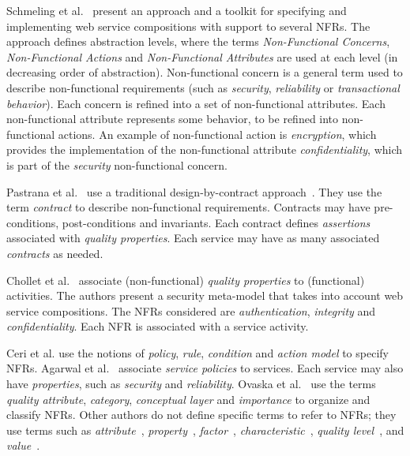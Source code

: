  
Schmeling et al.~\cite{SchmelingCM11} present an approach and a toolkit for specifying and implementing web service compositions with support to several NFRs. 
The approach defines abstraction levels, where the terms \textit{Non-Functional Concerns}, \textit{Non-Functional Actions} and \textit{Non-Functional Attributes} are used at each level (in decreasing order of abstraction).
Non-functional concern is a general term used to describe non-functional requirements (such as  \textit{security}, \textit{reliability} or \textit{transactional behavior}). 
Each concern is refined into a set of non-functional attributes.  
Each non-functional attribute represents some behavior, to be refined into non-functional actions. 
An example of non-functional action is \textit{encryption}, which provides the implementation of the non-functional attribute \textit{confidentiality}, which is part of the \textit{security} non-functional concern. 

Pastrana et al.~\cite{PastranaPK11} use a traditional design-by-contract approach~\cite{Meyer97}.
They use the term \textit{contract} to describe non-functional requirements. 
Contracts may have pre-conditions, post-conditions and invariants. 
Each contract defines \textit{assertions} associated with \textit{quality properties}. 
Each service may have as many associated \textit{contracts} as needed.

Chollet et al.~\cite{CholletL09} associate (non-functional) \textit{quality properties} to 
(functional) activities. 
The authors present a security meta-model that takes into account web service compositions. 
The NFRs considered are \textit{authentication}, \textit{integrity} and \textit{confidentiality}. 
Each NFR is associated with a service activity.


Ceri et al.\cite{CeriDMF07} use the notions of \textit{policy}, \textit{rule}, \textit{condition} and \textit{action model} to specify NFRs.
Agarwal et al.~\cite{AgarwalLS09} associate \textit{service policies} to services. 
Each service may also have \textit{properties}, such as \textit{security} and \textit{reliability}. 
Ovaska et al.~\cite{OvaskaEHPA10} use the terms \textit{quality attribute}, \textit{category}, \textit{conceptual layer} and \textit{importance} to organize and classify NFRs.
Other authors do not define specific terms to refer to NFRs; they use terms such as \textit{attribute}~\cite{ZhangPSP05,BasinDL06,JeongCL09}, 
\textit{property}~\cite{Fabra2011}, 
\textit{factor}~\cite{MohantyRP10,GutierrezRF10}, 
\textit{characteristic}~\cite{DiamadopoulouMPS08}, 
\textit{quality level}~\cite{ModicaTV09}, and
\textit{value}~\cite{ThissenW06,BasinDL06}.


